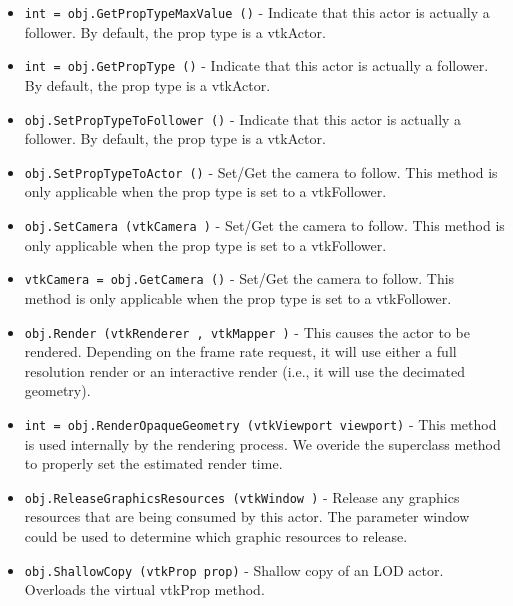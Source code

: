 \begin{itemize}
\item  \verb|int = obj.GetPropTypeMaxValue ()| -  Indicate that this actor is actually a follower. By default, the prop
 type is a vtkActor.

\item  \verb|int = obj.GetPropType ()| -  Indicate that this actor is actually a follower. By default, the prop
 type is a vtkActor.

\item  \verb|obj.SetPropTypeToFollower ()| -  Indicate that this actor is actually a follower. By default, the prop
 type is a vtkActor.

\item  \verb|obj.SetPropTypeToActor ()| -  Set/Get the camera to follow. This method is only applicable when the 
 prop type is set to a vtkFollower.

\item  \verb|obj.SetCamera (vtkCamera )| -  Set/Get the camera to follow. This method is only applicable when the 
 prop type is set to a vtkFollower.

\item  \verb|vtkCamera = obj.GetCamera ()| -  Set/Get the camera to follow. This method is only applicable when the 
 prop type is set to a vtkFollower.

\item  \verb|obj.Render (vtkRenderer , vtkMapper )| -  This causes the actor to be rendered. Depending on the frame rate request,
 it will use either a full resolution render or an interactive render (i.e.,
 it will use the decimated geometry).

\item  \verb|int = obj.RenderOpaqueGeometry (vtkViewport viewport)| -  This method is used internally by the rendering process. We overide 
 the superclass method to properly set the estimated render time.

\item  \verb|obj.ReleaseGraphicsResources (vtkWindow )| -  Release any graphics resources that are being consumed by this actor.
 The parameter window could be used to determine which graphic
 resources to release.

\item  \verb|obj.ShallowCopy (vtkProp prop)| -  Shallow copy of an LOD actor. Overloads the virtual vtkProp method.

\end{itemize}
